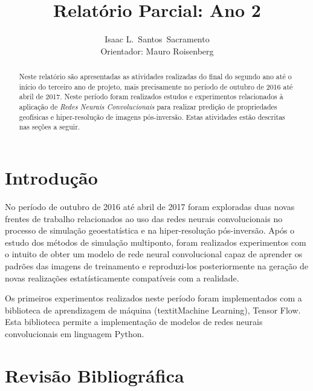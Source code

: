\documentclass[11pt]{article}
\title{Relatório Parcial: Ano 2}
\author{Isaac L.\ Santos\ Sacramento \\ Orientador: Mauro Roisenberg}
\begin{document}
\lstset{language=C++,basicstyle=\small,
        stringstyle=\ttfamily,showstringspaces=false}

\singlespace
\maketitle

\begin{abstract}                %
Neste relatório são apresentadas as atividades realizadas do final do segundo ano até o início do terceiro ano de projeto, mais precisamente no
período de outubro de 2016 até abril de 2017. Neste período foram realizados estudos e experimentos relacionados à aplicação
de \textit{Redes Neurais Convolucionais} para realizar predição de propriedades geofísicas e hiper-resolução de imagens pós-inversão.
Estas atividades estão descritas nas seções a seguir.

\end{abstract}

\doublespace
\setcounter{secnumdepth}{2}

\section{Introdução}

No período de outubro de 2016 até abril de 2017 foram exploradas duas novas frentes de trabalho relacionados ao uso
das redes neurais convolucionais no processo de simulação geoestatística e na hiper-resolução pós-inversão.
Após o estudo dos métodos de simulação multiponto, foram realizados experimentos com o intuito de obter um modelo de rede neural convolucional
capaz de aprender os padrões das imagens de treinamento e reproduzi-los posteriormente na geração de novas realizações estatísticamente compatíveis
com a realidade.

Os primeiros experimentos realizados neste período foram implementados 
com a biblioteca de aprendizagem de máquina (textit{Machine Learning}),
Tensor Flow. Esta biblioteca permite a implementação de modelos de redes
neurais convolucionais em linguagem Python.


\section{Revisão Bibliográfica}
\end{document}
